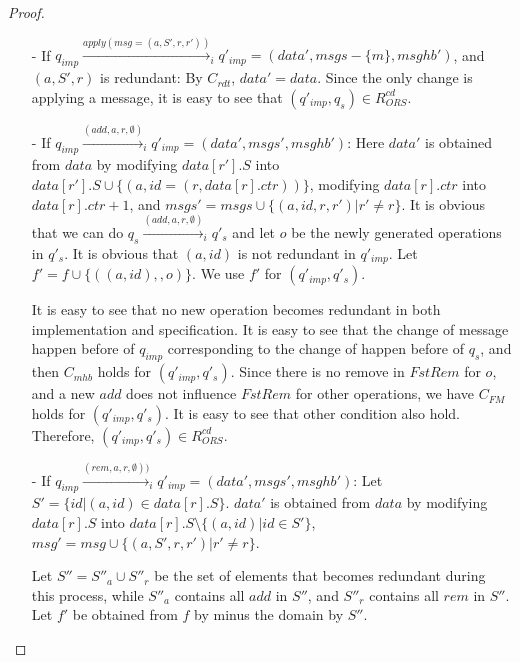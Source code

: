 \begin {proof}
\begin{itemize}
\item[-] If $q_{\mathit{imp}} \xrightarrow{\mathit{apply}( \mathit{msg}=(a,S',r,r' ))}_i q'_{\mathit{imp}} = (\mathit{data}',\mathit{msgs} - \{ m \},\mathit{msghb}')$, and $(a,S',r)$ is redundant: By $C_{\mathit{rdt}}$, $\mathit{data}' = \mathit{data}$. Since the only change is applying a message, it is easy to see that $(q'_{\mathit{imp}},q_s) \in R_{\mathit{ORS}}^{\mathit{cd}}$.

\item[-] If $q_{\mathit{imp}} \xrightarrow{(\mathit{add},a,r,\emptyset)}_i q'_{\mathit{imp}} = (\mathit{data}',\mathit{msgs}',\mathit{msghb}')$: Here $\mathit{data}'$ is obtained from $\mathit{data}$ by modifying $\mathit{data}[r'].S$ into $\mathit{data}[r'].S \cup \{ (a,\mathit{id} = (r,\mathit{data}[r].\mathit{ctr})) \}$, modifying $\mathit{data}[r].\mathit{ctr}$ into $\mathit{data}[r].\mathit{ctr}+1$, and $\mathit{msgs}' = \mathit{msgs} \cup \{ (a,\mathit{id},r,r') \vert r' \neq r \}$. It is obvious that we can do $q_s \xrightarrow{( \mathit{add},a,r,\emptyset )}_i q'_s$ and let $o$ be the newly generated operations in $q'_s$. It is obvious that $(a,\mathit{id})$ is not redundant in $q'_{\mathit{imp}}$. Let $f' = f \cup \{ ((a,id),,o) \}$. We use $f'$ for $(q'_{\mathit{imp}},q'_s)$.

    It is easy to see that no new operation becomes redundant in both implementation and specification. It is easy to see that the change of message happen before of $q_{\mathit{imp}}$ corresponding to the change of happen before of $q_s$, and then $C_{\mathit{mhb}}$ holds for $(q'_{\mathit{imp}},q'_s)$. Since there is no remove in $\mathit{FstRem}$ for $o$, and a new $\mathit{add}$ does not influence $\mathit{FstRem}$ for other operations, we have $C_{\mathit{FM}}$ holds for $(q'_{\mathit{imp}},q'_s)$. It is easy to see that other condition also hold. Therefore, $(q'_{\mathit{imp}},q'_s) \in R_{\mathit{ORS}}^{\mathit{cd}}$.

\item[-] If $q_{\mathit{imp}} \xrightarrow{( \mathit{rem},a,r,\emptyset ))}_i q'_{\mathit{imp}} = (\mathit{data}',\mathit{msgs}',\mathit{msghb}')$: Let $S' = \{ \mathit{id} \vert (a,\mathit{id}) \in \mathit{data}[r].S \}$. $\mathit{data}'$ is obtained from $\mathit{data}$ by modifying $\mathit{data}[r].S$ into $\mathit{data}[r].S \setminus \{ (a,\mathit{id}) \vert \mathit{id} \in S'\}$, $\mathit{msg}' = \mathit{msg} \cup \{ (a,S',r,r') \vert r' \neq r \}$.

    Let $S'' = S''_a \cup S''_r$ be the set of elements that becomes redundant during this process, while $S''_a$ contains all $\mathit{add}$ in $S''$, and $S''_r$ contains all $\mathit{rem}$ in $S''$. Let $f'$ be obtained from $f$ by minus the domain by $S''$.


\end{itemize}
\end{proof}
